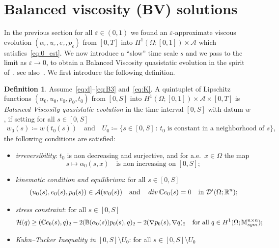 \documentclass[reqno]{amsart}
\theoremstyle{definition}
\newtheorem{definition}[corollary]{Definition}
\numberwithin{equation}{section}
\def\div {\mathop {\rm div}\nolimits}
\def\R {\mathbb R}
\def\M {\mathbb M^{n\times n}_{\rm sym}}
\def\C {\mathbb C}
\def\B {\mathbb B}
\begin{document}
\section{Balanced viscosity (BV) solutions}\label{sec:res_qvs}

In the previous section for all $\varepsilon\in(0,1)$ we found an $\varepsilon$-approximate viscous evolution $(\alpha_\varepsilon,u_\varepsilon,e_\varepsilon,p_\varepsilon)$ from $[0,T]$ into $H^1(\Omega;[0,1])\times\mathcal A$ which satisfies~\eqref{eq:0_est}. We now introduce a ``slow'' time scale $s$ and we pass to the limit as $\varepsilon\to 0$, to obtain a Balanced Viscosity quasistatic evolution in the spirit of~\cite{CrLa}, see also~\cite{DMDSSo,EfMi,MieRosSav12}. We first introduce the following definition.

\begin{definition}\label{def:BV_sol}
Assume~\eqref{eq:d}--\eqref{eq:B3} and~\eqref{eq:K}. A quintuplet of Lipschitz functions $(\alpha_0,u_0,e_0,p_0,t_0)$ from $[0,S]$ into $H^1(\Omega;[0,1])\times\mathcal A\times [0,T]$ is \textit{Balanced Viscosity quasistatic evolution} in the time interval $[0,S]$ with datum $w$, if setting for all $s\in[0,S]$
\begin{align*}
w_0(s)\coloneqq w(t_0(s))\quad\text{and}\quad U_0\coloneqq \{s\in[0,S]\,:\,\text{$t_0$ is constant in a neighborhood of $s$}\},
\end{align*}
the following conditions are satisfied:
\begin{itemize}
\item[$(ev0)$] {\it irreversibility}: $t_0$ is non decreasing and surjective, and for a.e.\ $x\in\Omega$ the map
\begin{equation*}
s\mapsto \alpha_0(s,x)\quad\text{is non increasing on $[0,S]$};
\end{equation*}
\item[$(ev1)$] {\it kinematic condition and equilibrium}: for all $s\in[0,S]$ 
\begin{equation*} 
(u_0(s),e_0(s),p_0(s))\in \mathcal A(w_0(s))\quad\text{and}\quad \div \C e_0(s)=0\quad\text{in $\mathcal D'(\Omega;\R^n)$};
\end{equation*}
\item[$(ev2)$] {\it stress constraint}: for all $s\in[0,S]$
\begin{equation*}
\mathcal H(q)\ge (\C e_0(s),q)_2-2(\B(\alpha_0(s))p_0(s),q)_2-2(\nabla p_0(s),\nabla q)_2\quad\text{for all $q\in H^1(\Omega;\M)$;}
\end{equation*}
\item[$(ev3)$] {\it Kuhn–Tucker Inequality in $[0,S]\setminus U_0$}: for all $s\in[0,S]\setminus U_0$

\end{itemize}
\end{definition}
\end{document}
